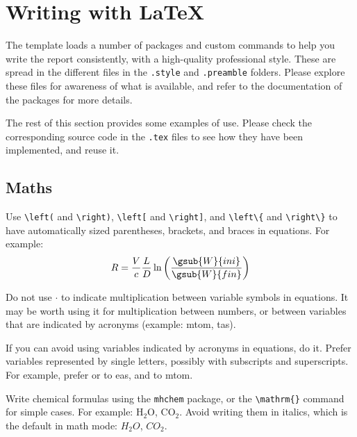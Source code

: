 \section{Writing with \LaTeX}

The template loads a number of packages and custom commands to help you write the report consistently, with a high-quality professional style.
These are spread in the different files in the \texttt{.style} and \texttt{.preamble} folders.
%
Please explore these files for awareness of what is available, and refer to the documentation of the packages for more details.

The rest of this section provides some examples of use.
Please check the corresponding source code in the \texttt{.tex} files to see how they have been implemented, and reuse it.


\subsection{Maths}

Use \texttt{\textbackslash left(} and \texttt{\textbackslash right)}, \texttt{\textbackslash left[} and \texttt{\textbackslash right]}, and \texttt{\textbackslash left\textbackslash\{} and \texttt{\textbackslash right\textbackslash\}} to have automatically sized parentheses, brackets, and braces in equations.
For example:
\begin{equation*}
    R = \frac{V}{c}\frac{L}{D}\ln\left( \frac{\gsub{W}{ini}}{\gsub{W}{fin}}\right) 
\end{equation*}


Do not use $\cdot$ to indicate multiplication between variable symbols in equations.
It may be worth using it for multiplication between numbers, or between variables that are indicated by acronyms (example: \gls{mtom}, \gls{tas}).


If you can avoid using variables indicated by acronyms in equations, do it.
Prefer variables represented by single letters, possibly with subscripts and superscripts.
For example, prefer  or  to \gls{eas}, and  to \gls{mtom}.


Write chemical formulas using the \texttt{mhchem} package, or the \texttt{\textbackslash mathrm\{\}} command for simple cases.
For example: $\mathrm{H_2O}$, $\mathrm{CO_2}$.
Avoid writing them in italics, which is the default in math mode: $H_2O$, $CO_2$.






